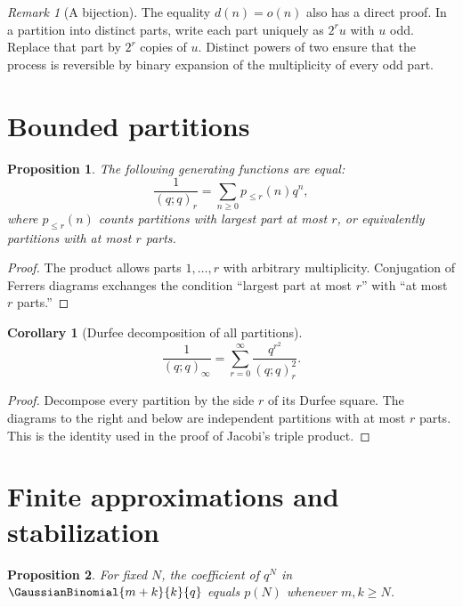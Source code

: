 \documentclass[11pt,a4paper,oneside,openany]{book}
\newtheorem{proposition}[proposition]{Proposition}
\newtheorem{corollary}[corollary]{Corollary}
\theoremstyle{definition}
\theoremstyle{remark}
\newtheorem{remark}[remark]{Remark}
\begin{document}
\begin{remark}[A bijection]
The equality $d(n)=o(n)$ also has a direct proof.  In a partition into distinct parts, write each part uniquely as $2^ru$ with $u$ odd.  Replace that part by $2^r$ copies of $u$.  Distinct powers of two ensure that the process is reversible by binary expansion of the multiplicity of every odd part.
\end{remark}

\section{Bounded partitions}

\begin{proposition}\label{prop:bounded-partitions}
The following generating functions are equal:
\[
 \frac1{(q;q)_r}
 =\sum_{n\ge0}p_{\le r}(n)q^n,
\]
where $p_{\le r}(n)$ counts partitions with largest part at most $r$, or equivalently partitions with at most $r$ parts.
\end{proposition}

\begin{proof}
The product allows parts $1,\dots,r$ with arbitrary multiplicity.  Conjugation of Ferrers diagrams exchanges the condition ``largest part at most $r$'' with ``at most $r$ parts.''
\end{proof}

\begin{corollary}[Durfee decomposition of all partitions]\label{cor:durfee-all}
\[
 \frac1{(q;q)_\infty}
 =\sum_{r=0}^{\infty}\frac{q^{r^2}}{(q;q)_r^2}.
\]
\end{corollary}

\begin{proof}
Decompose every partition by the side $r$ of its Durfee square.  The diagrams to the right and below are independent partitions with at most $r$ parts.  This is the identity used in the proof of Jacobi's triple product.
\end{proof}

\section{Finite approximations and stabilization}

\begin{proposition}\label{prop:partition-stabilization}
For fixed $N$, the coefficient of $q^N$ in $\GaussianBinomial{m+k}{k}{q}$ equals $p(N)$ whenever $m,k\ge N$.
\end{proposition}
\end{document}
